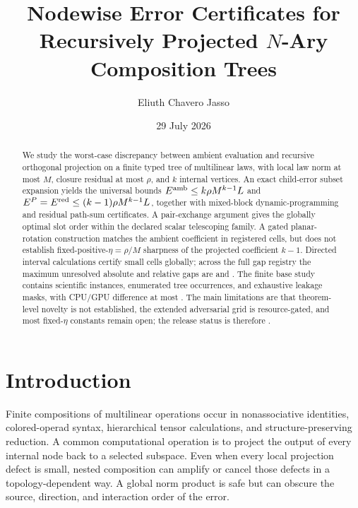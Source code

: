 \documentclass[11pt]{amsart}
\title[Nodewise tree error certificates]{Nodewise Error Certificates for Recursively Projected \texorpdfstring{\(N\)}{N}-Ary Composition Trees}
\author{Eliuth Chavero Jasso}
\date{29 July 2026}
\theoremstyle{definition}
\theoremstyle{remark}
\begin{document}
\begin{abstract}
We study the worst-case discrepancy between ambient evaluation and recursive orthogonal projection on a finite typed tree of multilinear laws, with local law norm at most \(M\), closure residual at most \(\rho\), and \(k\) internal vertices.  An exact child-error subset expansion yields the universal bounds \(E^{\rm amb}\le k\rho M^{k-1}L\) and \(E^P=E^{\rm red}\le(k-1)\rho M^{k-1}L\), together with mixed-block dynamic-programming and residual path-sum certificates.  A pair-exchange argument gives the globally optimal slot order within the declared scalar telescoping family.  A gated planar-rotation construction matches the ambient coefficient in registered cells, but does not establish fixed-positive-\(\eta=\rho/M\) sharpness of the projected coefficient \(k-1\).  Directed interval calculations certify \VThreeExactCells{} small cells globally; across the full gap registry the maximum unresolved absolute and relative gaps are \VThreeMaxAbsoluteGap{} and \VThreeMaxRelativeGap{}.  The finite base study contains \VThreeScientificInstances{} scientific instances, \VThreeTreeOccurrences{} enumerated tree occurrences, and \VThreeLeakageMasks{} exhaustive leakage masks, with CPU/GPU difference at most \VThreeMaxParity{}.  The main limitations are that theorem-level novelty is not established, the extended adversarial grid is resource-gated, and most fixed-\(\eta\) constants remain open; the release status is therefore \VThreeReleaseStatus{}.
\end{abstract}

\maketitle

\section{Introduction}

Finite compositions of multilinear operations occur in nonassociative
identities, colored-operad syntax, hierarchical tensor calculations, and
structure-preserving reduction.  A common computational operation is to
project the output of every internal node back to a selected subspace.  Even
when every local projection defect is small, nested composition can amplify
or cancel those defects in a topology-dependent way.  A global norm product
is safe but can obscure the source, direction, and interaction order of the
error.
\end{document}
